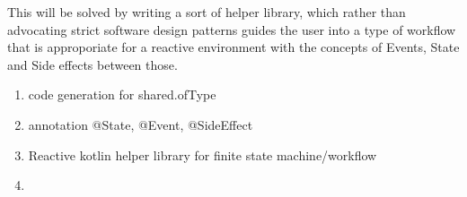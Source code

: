 This will be solved by writing a sort of helper library, which rather than advocating strict software design patterns
guides the user into a type of workflow that is approporiate for a reactive environment with the concepts
of Events, State and Side effects between those.

\begin{enumerate}

    \item code generation for shared.ofType
    \item annotation @State, @Event, @SideEffect
    \item Reactive kotlin helper library for finite state machine/workflow
    \item 

\end{enumerate}